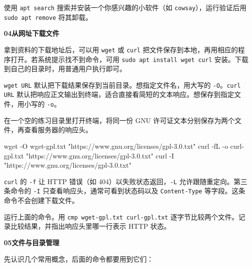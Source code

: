 \begin{exercise}\label{ex:v1-apt-package}
使用 \texttt{apt search} 搜索并安装一个你感兴趣的小软件（如 \texttt{cowsay}），运行验证后用 \texttt{sudo apt remove} 将其卸载。
\end{exercise}

\textbf{04从网址下载文件}

拿到资料的下载地址后，可以用 \texttt{wget} 或 \texttt{curl} 把文件保存到本地，再用相应的程序打开。若系统提示找不到命令，可用 \texttt{sudo apt install wget curl} 安装。下载到自己的目录时，用普通用户执行即可。

\texttt{wget URL} 默认把下载结果保存到当前目录。想指定文件名，用大写的 \texttt{-O}。\texttt{curl URL} 默认把响应正文输出到终端，适合直接看简短的文本响应。想保存到指定文件，用小写的 \texttt{-o}。

\begin{example}[用两种命令下载同一份文件]
在一个空的练习目录里打开终端，将同一份 GNU 许可证文本分别保存为两个文件，再查看服务器的响应头。
\begin{tbash}
wget -O wget-gpl.txt "https://www.gnu.org/licenses/gpl-3.0.txt"
curl -fL -o curl-gpl.txt "https://www.gnu.org/licenses/gpl-3.0.txt"
curl -I "https://www.gnu.org/licenses/gpl-3.0.txt"
\end{tbash}
\texttt{curl} 的 \texttt{-f} 让 HTTP 错误（如 404）以失败状态返回，\texttt{-L} 允许跟随重定向。第三条命令的 \texttt{-I} 只查看响应头，通常可看到状态码以及 \texttt{Content-Type} 等字段。这条命令不会创建下载文件。
\end{example}

\begin{exercise}\label{ex:v1-http-download}
运行上面的命令。用 \texttt{cmp wget-gpl.txt curl-gpl.txt} 逐字节比较两个文件。记录比较结果，并指出响应头里哪一行表示 HTTP 状态。
\end{exercise}

\textbf{05文件与目录管理}

先认识几个常用概念，后面的命令都要用到它们：

